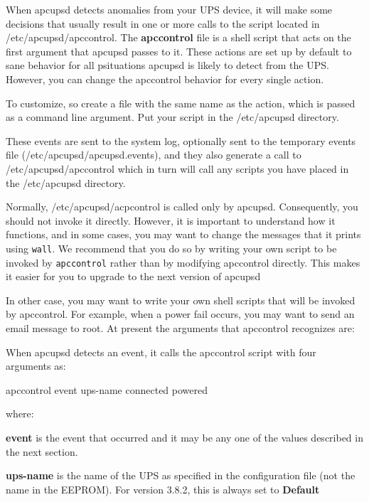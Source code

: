{{{{{{{{{\label{index-Event-handling-150}
\label{index-Customizing-event-handling-151}

When apcupsd detects anomalies from your UPS device, it will make some
decisions that usually result in one or more calls to the script located in
/etc/apcupsd/apccontrol. The {\bf apccontrol} file is a shell script that acts
on the first argument that apcupsd passes to it. These actions are set up by
default to sane behavior for all psituations apcupsd is likely to detect from
the UPS. However, you can change the apccontrol behavior for every single
action.  

To customize, so create a file with the same name as the action, which is
passed as a command line argument. Put your script in the /etc/apcupsd
directory.  

These events are sent to the system log, optionally sent to the temporary
events file (/etc/apcupsd/apcupsd.events), and they also generate a call to
/etc/apcupsd/apccontrol which in turn will call any scripts you have placed in
the /etc/apcupsd directory.  

Normally, /etc/apcupsd/acpcontrol is called only by apcupsd. Consequently, you
should not invoke it directly.  However, it is important to understand how it
functions, and in some cases, you may want to change the messages that it
prints using {\tt wall}. We recommend that you do so by writing your own
script to be invoked by {\tt apccontrol} rather than by modifying apccontrol
directly. This makes it easier for you to upgrade to the next version of
apcupsd  

In other case, you may want to write your own shell scripts that will be
invoked by apccontrol. For example, when a power fail occurs, you may want to
send an email message to root. At present the arguments that apccontrol
recognizes are:  

When apcupsd detects an event, it calls the apccontrol script with four
arguments as:  

apccontrol \lt{}event\gt{} \lt{}ups-name\gt{} \lt{}connected\gt{}
\lt{}powered\gt{}  

where:  

\begin{description}

\item {\bf event}
is the event that occurred and it may be any one of the values described in
the next section.  

\item {\bf ups-name}
is the name of the UPS as specified in the configuration file (not the name in
the EEPROM). For version 3.8.2, this is always set to {\bf Default}  


\end{description}}}}}}}}}}
